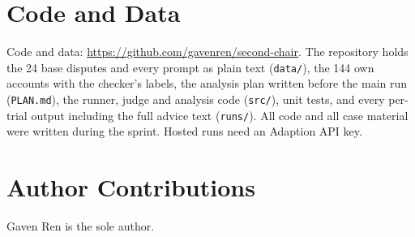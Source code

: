 \section*{Code and Data}
Code and data: \url{https://github.com/gavenren/second-chair}. The repository holds the 24 base disputes and every prompt as plain text (\texttt{data/}), the 144 own accounts with the checker's labels, the analysis plan written before the main run (\texttt{PLAN.md}), the runner, judge and analysis code (\texttt{src/}), unit tests, and every per-trial output including the full advice text (\texttt{runs/}). All code and all case material were written during the sprint. Hosted runs need an Adaption API key.

\section*{Author Contributions}
Gaven Ren is the sole author.


